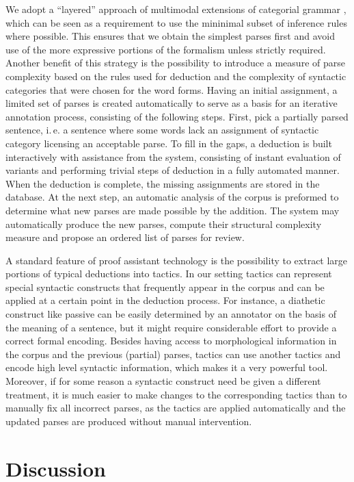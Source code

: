 \documentclass[a4paper]{article}
\theoremstyle{example-style}
\begin{document}
We adopt a ``layered'' approach of multimodal extensions of categorial grammar \parencite{morrill1994type,baldridge2003multi}, which can be seen as a requirement to use the mininimal subset of inference rules where possible. This ensures that we obtain the simplest parses first and avoid use of the more expressive portions of the formalism unless strictly required. Another benefit of this strategy is the possibility to introduce a measure of parse complexity based on the rules used for deduction and the complexity of syntactic categories that were chosen for the word forms. Having an initial assignment, a limited set of parses is created automatically to serve as a basis for an iterative annotation process, consisting of the following steps. First, pick a partially parsed sentence, i.\,e. a sentence where some words lack an assignment of syntactic category licensing an acceptable parse. To fill in the gaps, a deduction is built interactively with assistance from the system, consisting of instant evaluation of variants and performing trivial steps of deduction in a fully automated manner. When the deduction is complete, the missing assignments are stored in the database. At the next step, an automatic analysis of the corpus is preformed to determine what new parses are made possible by the addition. The system may automatically produce the new parses, compute their structural complexity measure and propose an ordered list of parses for review. 

A standard feature of proof assistant technology is the possibility to extract large portions of typical deductions into tactics. In our setting tactics can represent special syntactic constructs that frequently appear in the corpus and can be applied at a certain point in the deduction process. For instance, a diathetic construct like passive can be easily determined by an annotator on the basis of the meaning of a sentence, but it might require considerable effort to provide a correct formal encoding. Besides having access to morphological information in the corpus and the previous (partial) parses, tactics can use another tactics and encode high level syntactic information, which makes it a very powerful tool. Moreover, if for some reason a syntactic construct need be given a different treatment, it is much easier to make changes to the corresponding tactics than to manually fix all incorrect parses, as the tactics are applied automatically and the updated parses are produced without manual intervention.
  

\section{Discussion}
\end{document}
